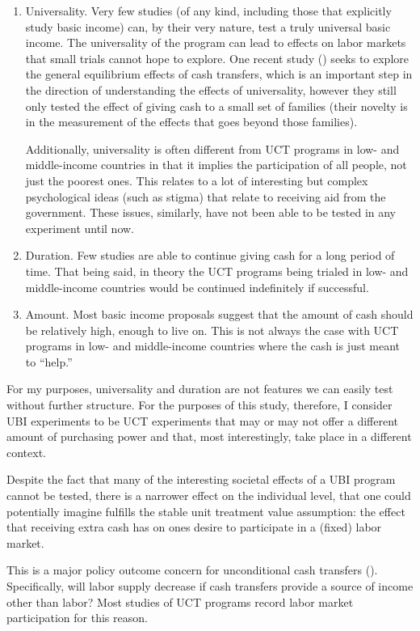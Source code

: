 \documentclass[a4paper,12pt]{article}
\begin{document}
\begin{enumerate}
\item Universality. Very few studies (of any kind, including those that explicitly study basic income) can, by their very nature, test a truly universal basic income. The universality of the program can lead to effects on labor markets that small trials cannot hope to explore. One recent study (\cite{Egger2019}) seeks to explore the general equilibrium effects of cash transfers, which is an important step in the direction of understanding the effects of universality, however they still only tested the effect of giving cash to a small set of families (their novelty is in the measurement of the effects that goes beyond those families).

Additionally, universality is often different from UCT programs in low- and middle-income countries in that it implies the participation of all people, not just the poorest ones. This relates to a lot of interesting but complex psychological ideas (such as stigma) that relate to receiving aid from the government. These issues, similarly, have not been able to be tested in any experiment until now.
\item Duration. Few studies are able to continue giving cash for a long period of time. That being said, in theory the UCT programs being trialed in low- and middle-income countries would be continued indefinitely if successful.
\item Amount. Most basic income proposals suggest that the amount of cash should be relatively high, enough to live on. This is not always the case with UCT programs in low- and middle-income countries where the cash is just meant to ``help.''
\end{enumerate}

For my purposes, universality and duration are not features we can easily test without further structure. For the purposes of this study, therefore, I consider UBI experiments to be UCT experiments that may or may not offer a different amount of purchasing power and that, most interestingly, take place in a different context.

Despite the fact that many of the interesting societal effects of a UBI program cannot be tested, there is a narrower effect on the individual level, that one could potentially imagine fulfills the stable unit treatment value assumption: the effect that receiving extra cash has on ones desire to participate in a (fixed) labor market.

This is a major policy outcome concern for unconditional cash transfers (\cite{Hoynes2019}). Specifically, will labor supply decrease if cash transfers provide a source of income other than labor? Most studies of UCT programs record labor market participation for this reason.
\end{document}
